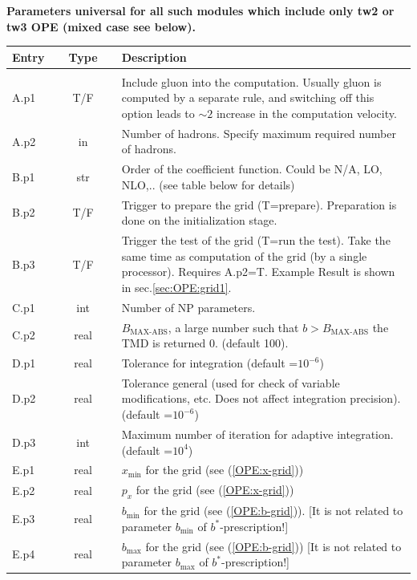 \documentclass[prd,nofootinbib,eqsecnum,final]{revtex4}
\renewcommand{\(}{\left(}
\renewcommand{\)}{\right)}
\renewcommand{\[}{\left[}
\renewcommand{\]}{\right]}
\begin{document}
\begin{center}
\textbf{Parameters universal for all such modules which include only tw2 or tw3 OPE (mixed case see below).} 
\\
\begin{tabular}{||p{1.5cm}||c||p{12.5cm}||}
\hline\hline
Entry &~~Type~~& Description
\\\hline
\\\hline\hline
A.p1 & T/F & Include gluon into the computation. Usually gluon is computed by a separate rule, and switching off this option leads to $\sim 2$ increase in the computation velocity.
\\\hline
A.p2 & in & Number of hadrons. Specify maximum required number of hadrons.
\\\hline\hline
B.p1 & str & Order of the coefficient function. Could be N/A, LO, NLO,.. (see table below for details)
\\\hline
B.p2 & T/F & Trigger to prepare the grid (T=prepare). Preparation is done on the initialization stage.
\\\hline
B.p3 & T/F & Trigger the test of the grid (T=run the test). Take the same time as computation of the grid (by a single processor). Requires A.p2=T. Example Result is shown in sec.\ref{sec:OPE:grid1}. 
\\\hline\hline
C.p1 & int & Number of NP parameters.
\\\hline
C.p2 & real & $B_{\text{MAX-ABS}}$, a large number such that $b>B_{\text{MAX-ABS}}$ the TMD is returned 0. (default 100).
\\\hline\hline
D.p1 & real & Tolerance for integration (default =$10^{-6}$)
\\\hline
D.p2 & real & Tolerance general (used for check of variable modifications, etc. Does not affect integration precision). (default =$10^{-6}$)
\\\hline
D.p3 & int & Maximum number of iteration for adaptive integration. (default =$10^{4}$)
\\\hline\hline
E.p1 & real & $x_{\text{min}}$ for the grid (see (\ref{OPE:x-grid}))
\\\hline
E.p2 & real & $p_x$ for the grid (see (\ref{OPE:x-grid}))
\\\hline
E.p3 & real & $b_{\text{min}}$ for the grid (see (\ref{OPE:b-grid})). [It is not related to parameter $b_{\min}$ of $b^*$-prescription!]
\\\hline
E.p4 & real & $b_{\max}$ for the grid (see (\ref{OPE:b-grid})) [It is not related to parameter $b_{\max}$ of $b^*$-prescription!]

\end{tabular}
\end{center}
\end{document}
